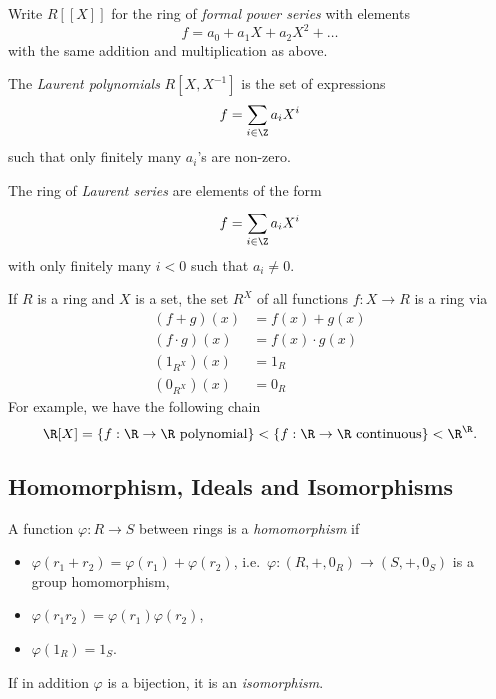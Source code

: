 \documentclass[a4paper]{article}
\theoremstyle{definition}
\begin{document}
\begin{eg}
  Write \(R[[X]]\) for the ring of \emph{formal power series} with elements
  \[
    f = a_0 + a_1X + a_2X^2 + \dots
  \]
  with the same addition and multiplication as above.
\end{eg}

\begin{eg}
  The \emph{Laurent polynomials} \(R[X, X^{-1}]\) is the set of expressions
  \[
    f = \sum_{i \in \Z} a_iX^i
  \]
  such that only finitely many \(a_i\)'s are non-zero.
\end{eg}

\begin{eg}
  The ring of \emph{Laurent series} are elements of the form
  \[
    f = \sum_{i \in \Z}^{ } a_iX^i
  \]
  with only finitely many \(i < 0\) such that \(a_i \neq 0\).
\end{eg}

\begin{eg}
  If \(R\) is a ring and \(X\) is a set, the set \(R^X\) of all functions \(f: X \to R\) is a ring via
  \begin{align*}
    (f + g)(x) &= f(x) + g(x) \\
    (f \cdot g)(x) &= f(x) \cdot g(x) \\
    (1_{R^X})(x) &= 1_R \\
    (0_{R^X})(x) &= 0_R
  \end{align*}
  For example, we have the following chain
  \[
    \R[X] = \{f: \R \to \R \text{ polynomial}\} < \{f: \R \to \R \text{ continuous}\} < \R^\R.
  \]
\end{eg}

\subsection{Homomorphism, Ideals and Isomorphisms}

\begin{definition}[Homomorphism]
  A function \(\varphi: R\to S\) between rings is a \emph{homomorphism} if
  \begin{itemize}
  \item \(\varphi(r_1 + r_2) = \varphi(r_1) + \varphi(r_2)\), i.e.\ \(\varphi:(R, +, 0_R) \to (S, +, 0_S)\) is a group homomorphism,
  \item \(\varphi(r_1r_2) = \varphi(r_1)\varphi(r_2)\),
  \item \(\varphi(1_R) = 1_S\).
  \end{itemize}

  If in addition \(\varphi\) is a bijection, it is an \emph{isomorphism}.
\end{definition}
\end{document}
